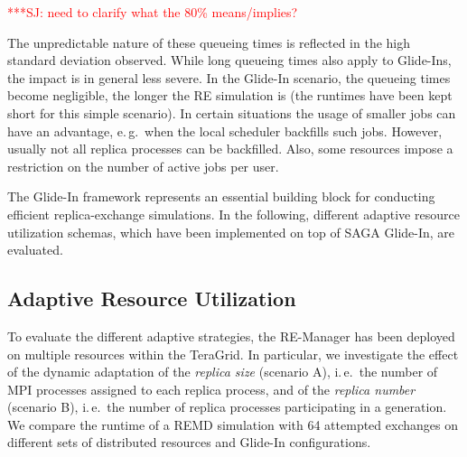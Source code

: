 \documentclass{rspublic}
\newcommand{\jhanote}[1]{ {\textcolor{red} { ***SJ: #1 }}}
\newcommand{\jhanote}[1]{}
\begin{document}
{\jhanote{need to clarify what the 80\% means/implies?}

The unpredictable nature of these queueing times is reflected in the
high standard deviation observed. While long queueing times 
also apply to Glide-Ins, the impact is in general less severe.
In the Glide-In scenario, the queueing times become
negligible, the longer the RE simulation is (the runtimes have been
kept short for this simple scenario). 
In certain situations the usage of smaller jobs can have an advantage,
e.\,g.\ when the local scheduler backfills such jobs. However, usually
not all replica processes can be backfilled. Also, some resources
impose a restriction on the number of active jobs per user. 


The Glide-In framework represents an essential building block for conducting efficient
replica-exchange simulations. In the following, different adaptive resource 
utilization schemas, which have been implemented on top of SAGA Glide-In,
are evaluated.

\subsection{Adaptive Resource Utilization}

To evaluate the different adaptive strategies, the RE-Manager
has been deployed on multiple resources within the
TeraGrid. In particular, we investigate the effect of 
the dynamic adaptation of the \emph{replica size} (scenario A), i.\,e.\ 
the number of MPI processes assigned to each replica process,  
and of the \emph{replica number} (scenario B), i.\,e.\
the number of replica processes participating in a generation.  
We compare the runtime of a REMD simulation with 64 attempted 
exchanges on different sets of distributed resources and Glide-In 
configurations.  
                    
}
\end{document}
